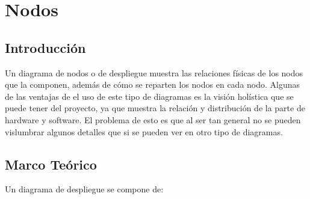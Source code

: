 \chapter{Nodos}
\section{Introducción}
Un diagrama de nodos o de despliegue muestra las relaciones físicas de los nodos que la componen, además de cómo se reparten los nodos en cada nodo. Algunas de las ventajas de el uso de este tipo  de diagramas es la visión holística que se puede tener del proyecto, ya que muestra la relación y distribución de la parte de hardware y software. El problema de esto es que al ser tan general no se pueden vislumbrar algunos detalles que si se pueden ver en otro tipo de diagramas.
\section{Marco Teórico}
Un diagrama de despliegue se compone de:
